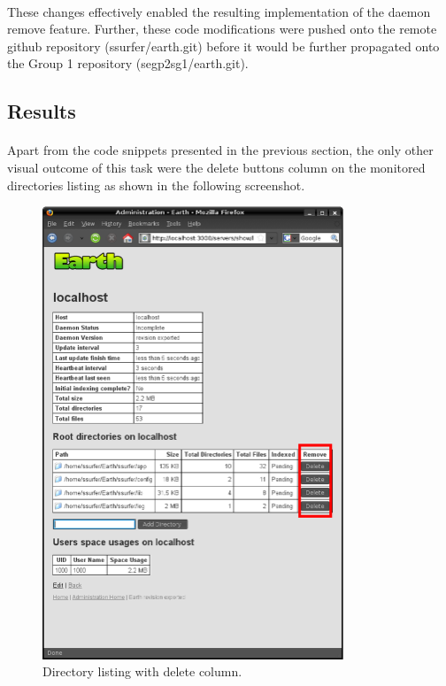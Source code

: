 \documentclass[10pt,a4,oneside]{article}
\begin{document}
\paragraph{}
These changes effectively enabled the resulting implementation of 
the daemon remove feature. Further, these code modifications were 
pushed onto the remote github repository (ssurfer/earth.git) before 
it would be further propagated onto the Group 1 repository 
(segp2sg1/earth.git).



\newpage

\subsection*{Results}

\paragraph{}
Apart from the code snippets presented in the previous section, 
the only other visual outcome of this task were the delete buttons 
column on the monitored directories listing as shown in the 
following screenshot.


\begin{figure}[h!]
\begin{center}
\includegraphics[width=90mm]{figs/screendel}
\end{center}
\caption{Directory listing with delete column.}
\label{fig:screendel}
\end{figure}
\end{document}
